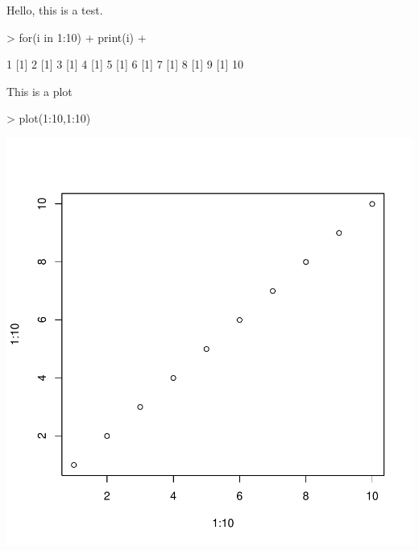 \documentclass{article}
\begin{document}
Hello, this is a test. 
\begin{Schunk}
\begin{Sinput}
> for(i in 1:10){
+   print(i)
+ }
\end{Sinput}
\begin{Soutput}
[1] 1
[1] 2
[1] 3
[1] 4
[1] 5
[1] 6
[1] 7
[1] 8
[1] 9
[1] 10
\end{Soutput}
\end{Schunk}
This is a plot
\begin{Schunk}
\begin{Sinput}
> plot(1:10,1:10)
\end{Sinput}
\end{Schunk}
\includegraphics{Tutorial_for_RADseq_Tools-015}
\end{document}
